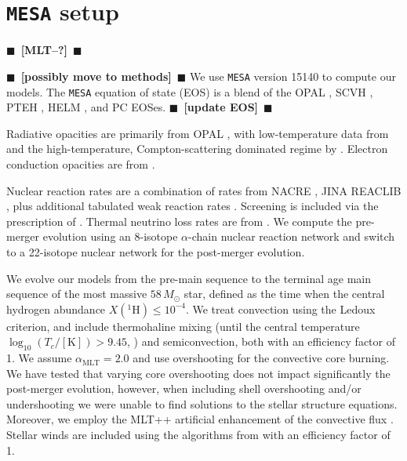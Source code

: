 \documentclass[twocolumn,twocolappendix,trackchanges]{aastex63}
\newcommand{\code}[1]{\texttt{#1}}
\newcommand{\todo}[1]{{\large $\blacksquare$~\textbf{\color{red}[#1]}}~$\blacksquare$}
\begin{document}
\appendix

\section{\texttt{MESA} setup}
\label{sec:software}

\todo{MLT--?}

\todo{possibly move to methods}
We use \code{MESA} version 15140 to compute our models.  The
\code{MESA} equation of state (EOS) is a blend of the OPAL \citet{Rogers2002}, SCVH
\citet{Saumon1995}, PTEH \citet{Pols1995}, HELM \citet{Timmes2000},
and PC \citet{Potekhin2010} EOSes. \todo{update EOS}

Radiative opacities are primarily from OPAL \citep{Iglesias1993,
  Iglesias1996}, with low-temperature data from \citet{Ferguson2005}
and the high-temperature, Compton-scattering dominated regime by
\citet{Buchler1976}. Electron conduction opacities are from
\citet{Cassisi2007}.

Nuclear reaction rates are a combination of rates from NACRE
\citep{Angulo1999}, JINA REACLIB \citep{Cyburt2010}, plus additional
tabulated weak reaction rates \citet{Fuller1985, Oda1994,
  Langanke2000}. Screening is included via the prescription of
\citet{Chugunov2007}.  Thermal neutrino loss rates are from
\citet{Itoh1996}. We compute the pre-merger evolution using an
8-isotope $\alpha$-chain nuclear reaction network and switch to a
22-isotope nuclear network for the post-merger evolution.

We evolve our models from the pre-main sequence to the terminal age
main sequence of the most massive $58\,M_\odot$ star, defined as the
time when the central hydrogen abundance $X(^1\mathrm{H})\leq 10^{-4}$.
We treat convection using the Ledoux criterion, and include
thermohaline mixing (until the central temperature
$\log_{10}(T_c/\mathrm{[K]})>9.45$, \citealt{farmer:16}) and semiconvection, both with an
efficiency factor of 1. We assume $\alpha_\mathrm{MLT}=2.0$ and use
\cite{brott:11} overshooting for the convective core burning. We have
tested that varying core overshooting does not impact significantly the
post-merger evolution, however, when including shell overshooting
and/or undershooting we were unable to find solutions to the stellar
structure equations. Moreover, we employ the MLT++ artificial
enhancement of the convective flux \citep[e.g.,][]{paxton:15,
  jiang:15}. Stellar winds are included using the algorithms from
\cite{vink:01} with an efficiency factor of 1.%
\end{document}
